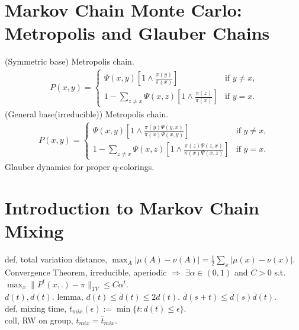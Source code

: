 \documentclass[paper=a4, fontsize=11pt]{scrartcl} %
\numberwithin{equation}{section} %
\numberwithin{figure}{section} %
\numberwithin{table}{section} %
\begin{document}
\section{Markov Chain Monte Carlo: Metropolis and Glauber Chains}
(Symmetric base) Metropolis chain.
\begin{align}
	P(x,y) = \begin{cases} \Psi(x,y)[1\wedge \frac{\pi(y)}{\pi(x)}] &\mbox{if $y\neq x$,}\\
		1 - \sum_{z\neq x} \Psi(x,z)[1\wedge \frac{\pi(z)}{\pi(x)}] &\mbox{if $y=x$.}\end{cases}
\end{align}
(General base(irreducible)) Metropolis chain.
\begin{align}
	P(x,y) = \begin{cases} \Psi(x,y)[1\wedge \frac{\pi(y)\Psi(y,x)}{\pi(x)\Psi(x,y)}] &\mbox{if $y\neq x$,}\\
		1 - \sum_{z\neq x} \Psi(x,z)[1\wedge \frac{\pi(z)\Psi(z,x)}{\pi(x)\Psi(x,z)}] &\mbox{if $y=x$.}\end{cases}
\end{align}
Glauber dynamics for proper q-colorings.\\

\section{Introduction to Markov Chain Mixing}
def, total variation distance, $\max_A |\mu(A)-\nu(A)|=\frac{1}{2}\sum_x|\mu(x)-\nu(x)|$.\\
Convergence Theorem, irreducible, aperiodic $\Rightarrow$ $\exists \alpha\in(0,1)$ and $C>0$ s.t. $\max_x \|P^t(x,.)-\pi\|_{TV}\leq C\alpha^t$.\\
$d(t),\overline{d}(t)$. lemma, $d(t)\leq \overline{d}(t)\leq 2d(t)$. $\overline{d}(s+t)\leq \overline{d}(s)\overline{d}(t)$.\\
def, mixing time, $t_{mix}(\epsilon):=\min\{t:d(t)\leq \epsilon\}$.\\
coll, RW on group, $t_{mix}=\widehat{t}_{mix}$.\\
\end{document}

